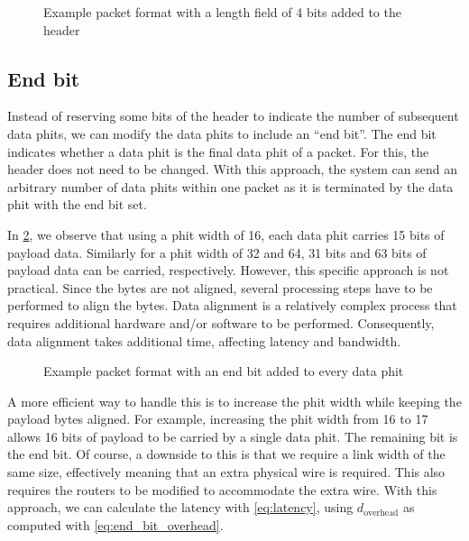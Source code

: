 \hspace*{0.5em}
\begin{figure}[hbtp]
    \centering
    \begin{adjustbox}{width=0.8\linewidth}
        
    \end{adjustbox}
    \caption{Example packet format with a length field of 4 bits added to the header}
    \label{fig:example_packet_format_length_field}
\end{figure}

\subsection{End bit}
Instead of reserving some bits of the header to indicate the number of subsequent data phits, we can modify the data phits to include an ``end bit''.
The end bit indicates whether a data phit is the final data phit of a packet.
For this, the header does not need to be changed.
With this approach, the system can send an arbitrary number of data phits within one packet as it is terminated by the data phit with the end bit set.

In \cref{fig:example_packet_format_end_bit}, we observe that using a phit width of 16, each data phit carries 15 bits of payload data.
Similarly for a phit width of 32 and 64, 31 bits and 63 bits of payload data can be carried, respectively.
However, this specific approach is not practical.
Since the bytes are not aligned, several processing steps have to be performed to align the bytes.
Data alignment is a relatively complex process that requires additional hardware and/or software to be performed.
Consequently, data alignment takes additional time, affecting latency and bandwidth. 

\hspace*{0.5em}
\begin{figure}[hbtp]
    \centering
    \begin{adjustbox}{width=0.8\linewidth}
        
    \end{adjustbox}
    \caption{Example packet format with an end bit added to every data phit}
    \label{fig:example_packet_format_end_bit}
\end{figure}

A more efficient way to handle this is to increase the phit width while keeping the payload bytes aligned.
For example, increasing the phit width from 16 to 17 allows 16 bits of payload to be carried by a single data phit.
The remaining bit is the end bit.
Of course, a downside to this is that we require a link width of the same size, effectively meaning that an extra physical wire is required.
This also requires the routers to be modified to accommodate the extra wire.
With this approach, we can calculate the latency with \cref{eq:latency}, using $d_{\text{overhead}}$ as computed with \cref{eq:end_bit_overhead}. 

